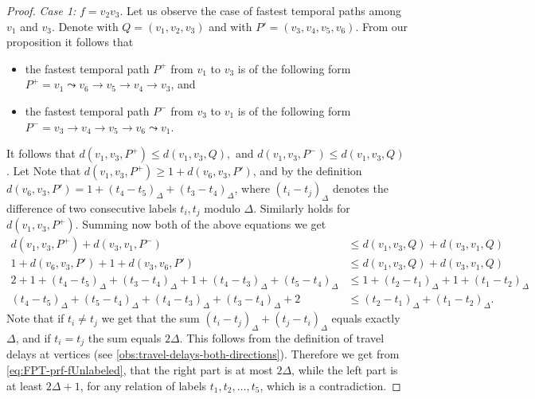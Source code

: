 \documentclass[a4paper,UKenglish,cleveref, autoref, thm-restate]{lipics-v2021}
\begin{document}
\begin{proof}
    \emph{Case 1: }$f = v_2v_3$.
    Let us observe the case of fastest temporal paths among $v_{1}$ and $v_{3}$.
    Denote with $Q = (v_{1}, v_2, v_3)$ and with $P' = (v_3,v_4,v_5,v_6)$.
    From our proposition it follows that
    \begin{itemize}
        \item the fastest temporal path $P ^ +$ from $v_1$ to $v_3$ 
    is of the following form 
    $P^+ = v_{1}  \leadsto v_6 \rightarrow v_5 \rightarrow v_4 \rightarrow v_3$,
    and
        \item the fastest temporal path $P ^ -$ from $v_{3}$ to $v_{1}$ 
    is of the following form 
    $P^- = v_{3} \rightarrow v_{4} \rightarrow v_5 \rightarrow v_6 \leadsto v_1$.
    \end{itemize}
    It follows that 
    $
    d(v_{1}, v_{3}, P^+) \leq d(v_{1}, v_{3}, Q),
    $
    and
    $
    d(v_{1}, v_{3}, P^-) \leq d(v_{1}, v_{3}, Q)
    $.
    Let 
    Note that $d(v_{1}, v_{3}, P^+) \geq 1 + d(v_6,v_3,P')$,
    and by the definition $d(v_6,v_3,P') = 1 + (t_4 - t_5)_\Delta + (t_3 - t_4)_\Delta$,
    where $(t_i - t_j)_\Delta$ denotes the difference of two consecutive labels $t_i, t_j$ modulo $\Delta$.
    Similarly holds for $d(v_{1}, v_{3}, P^+)$.
    Summing now both of the above equations we get
    \begin{equation}
    \begin{split} \label{eq:FPT-prf-fUnlabeled}
        d(v_{1}, v_{3}, P^+) + d(v_{3}, v_{1}, P^-) &\leq 
        d(v_{1}, v_{3}, Q) + d(v_{3}, v_{1}, Q) \\
        1 + d(v_6,v_3,P') + 1 + d(v_3,v_6,P') &\leq d(v_{1}, v_{3}, Q) + d(v_{3}, v_{1}, Q) \\
        2 + 
        1 + (t_4 - t_5)_\Delta + (t_3 - t_4)_\Delta +
        1 + (t_4 - t_3)_\Delta + (t_5 - t_4)_\Delta 
        &\leq 
        1 + (t_2 - t_1)_\Delta + 
        1 + (t_1 - t_2)_\Delta\\
        (t_4 - t_5)_\Delta + (t_5 - t_4)_\Delta +
        (t_4 - t_3)_\Delta + (t_3 - t_4)_\Delta  + 2 
        &\leq 
        (t_2 - t_1)_\Delta + (t_1 - t_2)_\Delta.
    \end{split}
    \end{equation}
    Note that if $t_i \neq t_j$ we get that 
    the sum
    $(t_i - t_j)_\Delta + (t_j - t_i)_\Delta$ equals exactly $\Delta$,
    and if $t_i = t_j$ the sum equals $2\Delta$.
    This follows from the definition of travel delays at vertices (see \cref{obs:travel-delays-both-directions}).
    Therefore we get from \cref{eq:FPT-prf-fUnlabeled}, 
    that the right part is at most $2 \Delta$, while the left part is at least $2 \Delta + 1$,
    for any relation of labels $t_1,t_2, \dots, t_5$,
    which is a contradiction.


\end{proof}
\end{document}
